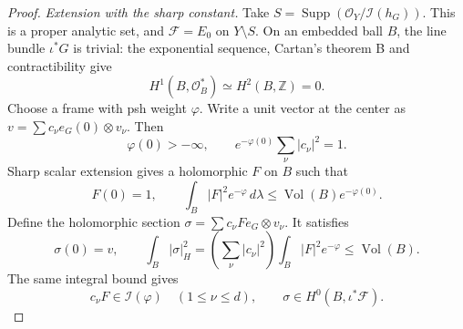 \documentclass[11pt,reqno]{amsart}
\numberwithin{equation}{section}
\theoremstyle{definition}
\theoremstyle{remark}
\begin{document}
\begin{proof}
\emph{Extension with the sharp constant.}
Take $S=\operatorname{Supp}(\mathcal O_Y/\mathcal I(h_G))$.
This is a proper analytic set, and $\mathcal F=E_0$ on $Y\setminus S$.
On an embedded ball $B$, the line bundle $\iota^*G$ is trivial:
the exponential sequence, Cartan's theorem B and contractibility give
\[
 H^1(B,\mathcal O_B^*)\simeq H^2(B,\mathbb Z)=0.
\]
Choose a frame with psh weight $\varphi$.  Write a unit vector at
the center as $v=\sum c_\nu e_G(0)\otimes v_\nu$.  Then
\[
 \varphi(0)>-\infty,\qquad
 e^{-\varphi(0)}\sum_\nu|c_\nu|^2=1.
\]
Sharp scalar extension \cite{GZ15} gives a holomorphic $F$ on $B$
such that
\[
 F(0)=1,\qquad
 \int_B|F|^2e^{-\varphi}\,d\lambda
 \le\operatorname{Vol}(B)e^{-\varphi(0)}.
\]
Define the holomorphic section
$\sigma=\sum c_\nu F e_G\otimes v_\nu$.  It satisfies
\[
 \sigma(0)=v,\qquad
 \int_B|\sigma|_H^2
 =\left(\sum_\nu|c_\nu|^2\right)\int_B|F|^2e^{-\varphi}
 \le\operatorname{Vol}(B).
\]
The same integral bound gives
\[
 c_\nu F\in\mathcal I(\varphi)\quad(1\le\nu\le d),
 \qquad \sigma\in H^0(B,\iota^*\mathcal F).
\]
\end{proof}
\end{document}
